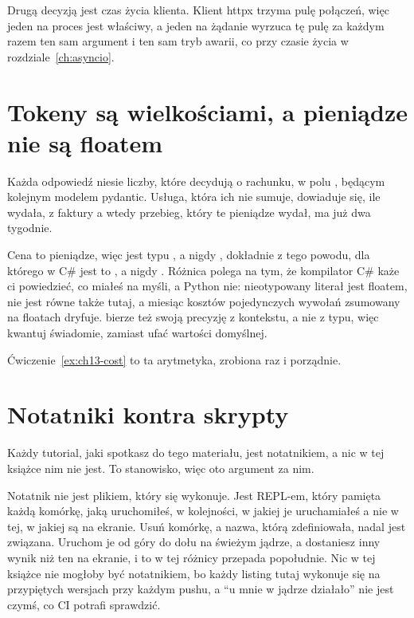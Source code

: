 Drugą decyzją jest czas życia klienta. Klient httpx trzyma pulę połączeń,
więc jeden na proces jest właściwy, a jeden na żądanie wyrzuca tę pulę za
każdym razem \dash{} ten sam argument i ten sam tryb awarii, co przy czasie
życia  w rozdziale~\ref{ch:asyncio}.

\section{Tokeny są wielkościami, a pieniądze nie są floatem}
\label{sec:ai-tokens}

Każda odpowiedź niesie liczby, które decydują o rachunku, w polu
, będącym kolejnym modelem pydantic. Usługa, która ich nie
sumuje, dowiaduje się, ile wydała, z faktury \dash{} a wtedy przebieg, który
te pieniądze wydał, ma już dwa tygodnie.

\begin{csbox}
Cena to pieniądze, więc jest typu , a nigdy ,
dokładnie z tego powodu, dla którego w C\# jest to , a nigdy
. Różnica polega na tym, że kompilator C\# każe ci powiedzieć,
co miałeś na myśli, a Python nie: nieotypowany literał jest floatem,
 nie jest równe  także tutaj, a miesiąc kosztów
pojedynczych wywołań zsumowany na floatach dryfuje.  bierze
też swoją precyzję z kontekstu, a nie z typu, więc kwantuj świadomie,
zamiast ufać wartości domyślnej.
\end{csbox}

Ćwiczenie~\ref{ex:ch13-cost} to ta arytmetyka, zrobiona raz i porządnie.

\section{Notatniki kontra skrypty}
\label{sec:ai-notebooks}

Każdy tutorial, jaki spotkasz do tego materiału, jest notatnikiem, a nic w
tej książce nim nie jest. To stanowisko, więc oto argument za nim.

Notatnik nie jest plikiem, który się wykonuje. Jest REPL-em, który pamięta
każdą komórkę, jaką uruchomiłeś, w kolejności, w jakiej je uruchamiałeś
\dash{} a nie w tej, w jakiej są na ekranie. Usuń komórkę, a nazwa, którą
zdefiniowała, nadal jest związana. Uruchom je od góry do dołu na świeżym
jądrze, a dostaniesz inny wynik niż ten na ekranie, i to w tej różnicy
przepada popołudnie. Nic w tej książce nie mogłoby być notatnikiem, bo każdy
listing tutaj wykonuje się na przypiętych wersjach przy każdym pushu, a
\enquote{u mnie w jądrze działało} nie jest czymś, co CI potrafi sprawdzić.

